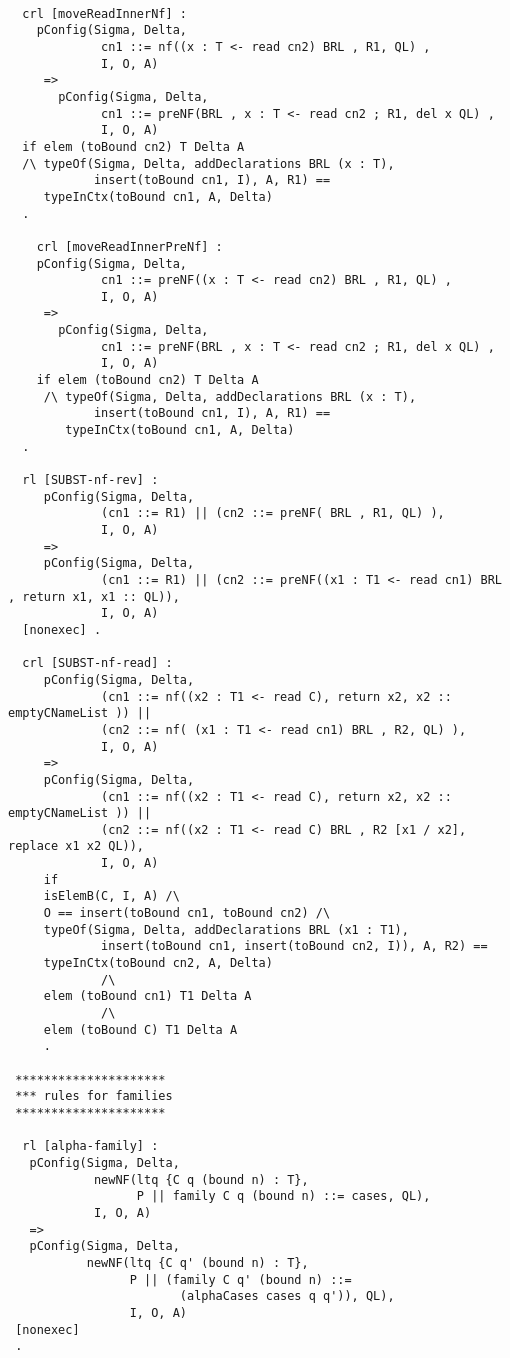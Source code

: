 \begin{lstlisting}
     
  crl [moveReadInnerNf] :
    pConfig(Sigma, Delta,
             cn1 ::= nf((x : T <- read cn2) BRL , R1, QL) ,
             I, O, A)  
     => 
       pConfig(Sigma, Delta,
             cn1 ::= preNF(BRL , x : T <- read cn2 ; R1, del x QL) ,
             I, O, A)    
  if elem (toBound cn2) T Delta A 
  /\ typeOf(Sigma, Delta, addDeclarations BRL (x : T), 
            insert(toBound cn1, I), A, R1) == 
     typeInCtx(toBound cn1, A, Delta)
  .  
  
    crl [moveReadInnerPreNf] :
    pConfig(Sigma, Delta,
             cn1 ::= preNF((x : T <- read cn2) BRL , R1, QL) ,
             I, O, A)  
     => 
       pConfig(Sigma, Delta,
             cn1 ::= preNF(BRL , x : T <- read cn2 ; R1, del x QL) ,
             I, O, A)  
    if elem (toBound cn2) T Delta A 
     /\ typeOf(Sigma, Delta, addDeclarations BRL (x : T), 
            insert(toBound cn1, I), A, R1) == 
        typeInCtx(toBound cn1, A, Delta)          
  .   
    
  rl [SUBST-nf-rev] : 
     pConfig(Sigma, Delta,
             (cn1 ::= R1) || (cn2 ::= preNF( BRL , R1, QL) ),
             I, O, A)  
     => 
     pConfig(Sigma, Delta,
             (cn1 ::= R1) || (cn2 ::= preNF((x1 : T1 <- read cn1) BRL , return x1, x1 :: QL)),
             I, O, A)   
  [nonexec] .  
  
  crl [SUBST-nf-read] : 
     pConfig(Sigma, Delta,
             (cn1 ::= nf((x2 : T1 <- read C), return x2, x2 :: emptyCNameList )) || 
             (cn2 ::= nf( (x1 : T1 <- read cn1) BRL , R2, QL) ),
             I, O, A)  
     => 
     pConfig(Sigma, Delta,
             (cn1 ::= nf((x2 : T1 <- read C), return x2, x2 :: emptyCNameList )) || 
             (cn2 ::= nf((x2 : T1 <- read C) BRL , R2 [x1 / x2], replace x1 x2 QL)),
             I, O, A) 
     if
     isElemB(C, I, A) /\
     O == insert(toBound cn1, toBound cn2) /\ 
     typeOf(Sigma, Delta, addDeclarations BRL (x1 : T1), 
             insert(toBound cn1, insert(toBound cn2, I)), A, R2) ==
     typeInCtx(toBound cn2, A, Delta)
             /\
     elem (toBound cn1) T1 Delta A 
             /\
     elem (toBound C) T1 Delta A           
     .   
 
 *********************
 *** rules for families
 *********************

  rl [alpha-family] :
   pConfig(Sigma, Delta, 
            newNF(ltq {C q (bound n) : T}, 
                  P || family C q (bound n) ::= cases, QL), 
            I, O, A)
   => 
   pConfig(Sigma, Delta, 
           newNF(ltq {C q' (bound n) : T}, 
                 P || (family C q' (bound n) ::= 
                        (alphaCases cases q q')), QL), 
                 I, O, A)
 [nonexec]
 .
  

\end{lstlisting}
